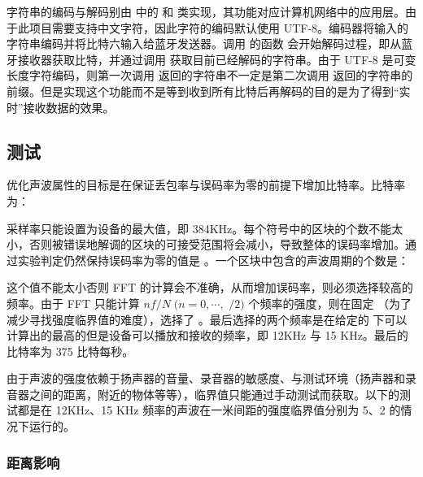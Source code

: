 字符串的编码与解码别由  中的  和  类实现，其功能对应计算机网络中的应用层。由于此项目需要支持中文字符，因此字符的编码默认使用 UTF-8。编码器将输入的字符串编码并将比特六输入给蓝牙发送器。调用  的函数  会开始解码过程，即从蓝牙接收器获取比特，并通过调用  获取目前已经解码的字符串。由于 UTF-8 是可变长度字符编码，则第一次调用  返回的字符串不一定是第二次调用  返回的字符串的前缀。但是实现这个功能而不是等到收到所有比特后再解码的目的是为了得到“实时”接收数据的效果。

\subsection{测试}

优化声波属性的目标是在保证丢包率与误码率为零的前提下增加比特率。比特率为：

\noindent{}

采样率只能设置为设备的最大值，即 384KHz。每个符号中的区块的个数不能太小，否则被错误地解调的区块的可接受范围将会减小，导致整体的误码率增加。通过实验判定仍然保持误码率为零的值是 。一个区块中包含的声波周期的个数是：

\noindent{}

这个值不能太小否则 FFT 的计算会不准确，从而增加误码率，则必须选择较高的频率。由于 FFT 只能计算 $nf/N\;(n=0,\cdots,$  $/2)$ 个频率的强度，则在固定 （为了减少寻找强度临界值的难度），选择了 。最后选择的两个频率是在给定的  下可以计算出的最高的但是设备可以播放和接收的频率，即 12KHz 与 15 KHz。最后的比特率为 375 比特每秒。

\newpage

由于声波的强度依赖于扬声器的音量、录音器的敏感度、与测试环境（扬声器和录音器之间的距离，附近的物体等等），临界值只能通过手动测试而获取。以下的测试都是在 12KHz、15 KHz 频率的声波在一米间距的强度临界值分别为 5、2 的情况下运行的。

\subsubsection{距离影响}

